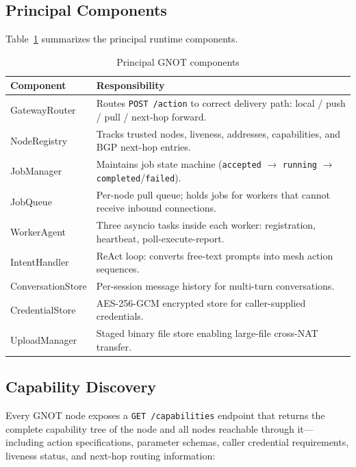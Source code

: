 \documentclass[10pt,twocolumn]{article}
\begin{document}
\subsection{Principal Components}

Table~\ref{tab:components} summarizes the principal runtime components.

\begin{table}[h]
\centering
\caption{Principal GNOT components}
\label{tab:components}
\small
\begin{tabular}{@{}lp{5.0cm}@{}}
\toprule
\textbf{Component} & \textbf{Responsibility} \\
\midrule
GatewayRouter & Routes \texttt{POST /action} to correct delivery path: local / push / pull / next-hop forward. \\
NodeRegistry & Tracks trusted nodes, liveness, addresses, capabilities, and BGP next-hop entries. \\
JobManager & Maintains job state machine (\texttt{accepted} $\to$ \texttt{running} $\to$ \texttt{completed}/\texttt{failed}). \\
JobQueue & Per-node pull queue; holds jobs for workers that cannot receive inbound connections. \\
WorkerAgent & Three asyncio tasks inside each worker: registration, heartbeat, poll-execute-report. \\
IntentHandler & ReAct loop: converts free-text prompts into mesh action sequences. \\
ConversationStore & Per-session message history for multi-turn conversations. \\
CredentialStore & AES-256-GCM encrypted store for caller-supplied credentials. \\
UploadManager & Staged binary file store enabling large-file cross-NAT transfer. \\
\bottomrule
\end{tabular}
\end{table}

\subsection{Capability Discovery}
\label{sec:discovery}

Every GNOT node exposes a \texttt{GET /capabilities} endpoint that
returns the complete capability tree of the node and all nodes
reachable through it---including action specifications, parameter
schemas, caller credential requirements, liveness status, and
next-hop routing information:
\end{document}
